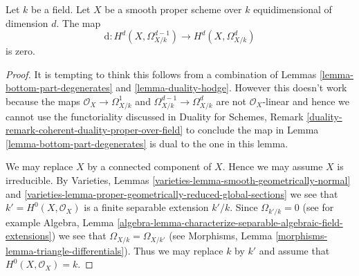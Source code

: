 \begin{lemma}
\label{lemma-top-part-degenerates}
Let $k$ be a field. Let $X$ be a smooth proper scheme over $k$
equidimensional of dimension $d$. The map
$$
\text{d} : H^d(X, \Omega^{d - 1}_{X/k}) \to H^d(X, \Omega^d_{X/k})
$$
is zero.
\end{lemma}

\begin{proof}
It is tempting to think this follows from a combination of
Lemmas \ref{lemma-bottom-part-degenerates} and \ref{lemma-duality-hodge}.
However this doesn't work because the maps $\mathcal{O}_X \to \Omega^1_{X/k}$
and $\Omega^{d - 1}_{X/k} \to \Omega^d_{X/k}$ are not $\mathcal{O}_X$-linear
and hence we cannot use the functoriality discussed in
Duality for Schemes, Remark
\ref{duality-remark-coherent-duality-proper-over-field}
to conclude the map in Lemma \ref{lemma-bottom-part-degenerates}
is dual to the one in this lemma.

\medskip\noindent
We may replace $X$ by a connected component of $X$. Hence we may assume
$X$ is irreducible. By
Varieties, Lemmas \ref{varieties-lemma-smooth-geometrically-normal} and
\ref{varieties-lemma-proper-geometrically-reduced-global-sections}
we see that $k' = H^0(X, \mathcal{O}_X)$ is a finite separable
extension $k'/k$. Since $\Omega_{k'/k} = 0$
(see for example Algebra, Lemma
\ref{algebra-lemma-characterize-separable-algebraic-field-extensions})
we see that $\Omega_{X/k} = \Omega_{X/k'}$
(see Morphisms, Lemma \ref{morphisms-lemma-triangle-differentials}).
Thus we may replace $k$ by $k'$ and assume that $H^0(X, \mathcal{O}_X) = k$.


\end{proof}
